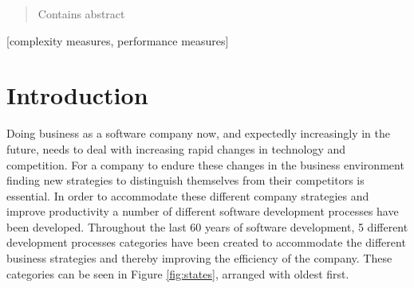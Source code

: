 \documentclass{sig-alternate}
\begin{document}
\maketitle
\begin{abstract}
Contains abstract
\end{abstract}

[complexity measures, performance measures]



\section{Introduction}
Doing business as a software company now, and expectedly increasingly in the future, needs to deal with increasing rapid changes in technology and competition. For a company to endure these changes in the business environment finding new strategies to distinguish themselves from their competitors is essential.\cite{stefan:valuebased}       
In order to accommodate these different company strategies and improve productivity a number of different software development processes have been developed. 
Throughout the last 60 years of software development, 5 different development processes categories have been created to accommodate the different business strategies and thereby improving the efficiency of the company. These categories can be seen in Figure \ref{fig:states}, arranged with oldest first.
\end{document}
